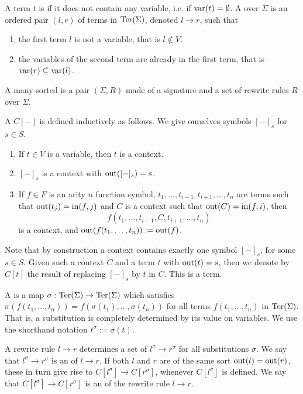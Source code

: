 A term $t$ is  if it does not contain any variable, i.e. if $\operatorname{var}(t)=\emptyset$.
A  over $\Sigma$ is an ordered pair $(l,r)$ of terms in $\operatorname{Ter}(\Sigma)$, denoted $l \to r$, such that
\begin{enumerate}
  \item the first term $l$ is not a variable, that is $l \notin V$.
  \item the variables of the second term are already in the first term, that is $\operatorname{var}(r) \subseteq \operatorname{var}(l)$.
\end{enumerate}

\begin{definition}
  A many-sorted  is a pair $(\Sigma,R)$ made of a signature and a set of rewrite rules $R$ over $\Sigma$.
\end{definition}

A  $C[-]$ is defined inductively as follows.
We give ourselves symbols $[-]_s$ for $s \in S$. 
\begin{enumerate}
  \item If $t \in V$ is a variable, then $t$ is a context.
  \item $[-]_s$ is a context with $\operatorname{out}([-]_s)=s$.
  \item If $f \in F$ is an arity $n$ function symbol, $t_1,\ldots,t_{i-1},t_{i+1},\ldots,t_n$ are terms such that $\operatorname{out}(t_j)=\operatorname{in}(f,j)$ and $C$ is a context such that $\operatorname{out}(C)=\operatorname{in}(f,i)$, then 
  $$f(t_1,\ldots,t_{i-1},C,t_{i+1},\ldots,t_n)$$
   is a context, and $\operatorname{out}(f(t_1,\ldots,t_n)):=\operatorname{out}(f)$.
\end{enumerate}

Note that by construction a context contains exactly one symbol $[-]_s$, for some $s \in S$.
Given such a context $C$ and a term $t$ with $\operatorname{out}(t)=s$, then we denote by $C[t]$ the result of replacing $[-]_s$ by $t$ in $C$.
This is a term. 

A  is a map $\sigma : \operatorname{Ter}(\Sigma) \to \operatorname{Ter}(\Sigma)$ which satisfies $\sigma(f(t_1,\ldots,t_n))=f(\sigma(t_1),\ldots,\sigma(t_n))$ for all terms $f(t_1,\ldots,t_n)$ in $\operatorname{Ter}(\Sigma)$.
That is, a substitution is completely determined by its value on variables.
We use the shorthand notation $t^{\sigma}:=\sigma(t)$.

A rewrite rule $l \to r$ determines a set of  $l^\sigma \to r^\sigma$ for all substitutions $\sigma$. 
We say that $l^\sigma \to r^\sigma$ is an  of $l \to r$.
If both $l$ and $r$ are of the same sort $\operatorname{out}(l)=\operatorname{out}(r)$, these in turn give rise to  $C[l^\sigma] \to C[r^\sigma]$, whenever $C[l^\sigma]$ is defined. 
We say that $C[l^\sigma] \to C[r^\sigma]$ is an  of the rewrite rule $l \to r$.

